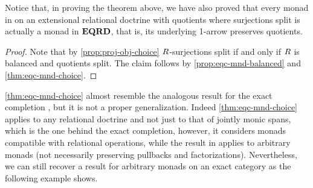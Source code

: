 Notice that, in proving the  theorem above, we have also proved that every monad in \RDtn on an extensional relational doctrine with quotients where surjections split is actually a monad in $\mathbf{EQRD}$, that is, its underlying 1-arrow preserves quotients. 

\begin{proof}
Note that by \cref{prop:proj-obj-choice}  $R$-surjections split if and only if $R$ is balanced and quotients split. The claim follows by  \cref{prop:eqc-mnd-balanced} and \cref{thm:eqc-mnd-choice}. 
\end{proof}


\cref{thm:eqc-mnd-choice} almost resemble the analogous result for the exact completion \cite{Vitale94}, but it is not a proper generalization. 
Indeed \cref{thm:eqc-mnd-choice} applies to any relational doctrine and not just to that of jointly monic spans, which is the one behind the exact completion, 
however, it considers monads compatible with relational operations, while the result in \cite{Vitale94} applies to arbitrary monads (not necessarily preserving pullbacks and factorizations).
Nevertheless, we can still recover a result for arbitrary monads on an exact category as the following example shows. 

